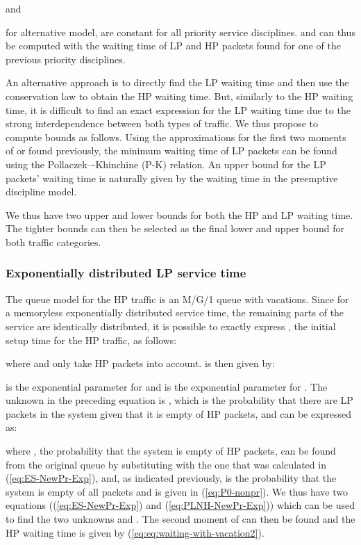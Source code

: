 \documentclass[11pt,journal,oneside,onecolumn,draftclsnofoot]{IEEEtran}
\begin{document}
and  

for alternative model, are constant for all priority service disciplines.  and  can thus be computed with the waiting time of LP and HP packets found for one of the previous priority disciplines.  

An alternative approach is to directly find the LP waiting time and then use the conservation law to obtain the HP waiting time. But, similarly to the HP waiting time, it is difficult to find an exact expression for the LP waiting time due to the strong interdependence between both types of traffic. We thus propose to compute bounds as follows.
Using the approximations for the first two moments of  or  found previously, the minimum waiting time of LP packets can be found using the {Pollaczek–-Khinchine} ({P-K}) relation. An upper bound for the LP packets' waiting time is naturally given by the waiting time in the preemptive discipline model. 


We thus have two upper and lower bounds for both the HP and LP waiting time. The tighter bounds can then be selected as the final lower and upper bound for both traffic categories.



\subsubsection{Exponentially distributed LP service time}
\label{sec:preempt_failure_exp}

The queue model for the HP traffic is an M/G/1 queue with vacations. Since for a memoryless exponentially distributed service time, the remaining parts of the service are identically distributed, it is possible to exactly express , the initial setup time for the HP traffic, as follows:

where  and  only take HP packets into account.  is then given by:

 is the exponential parameter for  and  is the exponential parameter for .
The unknown in the preceding equation is , which is the probability that there are LP packets in the system given that it is empty of HP packets, and can be expressed as:

where , the probability that the system is empty of HP packets,  can be found from the original queue by substituting  with the one that was calculated in (\ref{eq:ES-NewPr-Exp}), and, as indicated previously,  is the probability that the system is empty of all packets and is given in (\ref{eq:P0-nonpr}). We thus have two equations ((\ref{eq:ES-NewPr-Exp}) and (\ref{eq:PLNH-NewPr-Exp})) which can be used to find the two unknowns  and . The second moment of  can then be found and the HP waiting time is given by (\ref{eq:eq:waiting-with-vacation2}).
\end{document}
